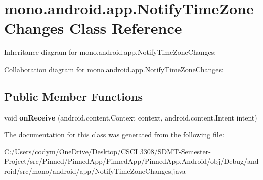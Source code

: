 \hypertarget{classmono_1_1android_1_1app_1_1_notify_time_zone_changes}{}\section{mono.\+android.\+app.\+Notify\+Time\+Zone\+Changes Class Reference}
\label{classmono_1_1android_1_1app_1_1_notify_time_zone_changes}


Inheritance diagram for mono.\+android.\+app.\+Notify\+Time\+Zone\+Changes\+:


Collaboration diagram for mono.\+android.\+app.\+Notify\+Time\+Zone\+Changes\+:
\subsection*{Public Member Functions}
\begin{DoxyCompactItemize}
\item 
\mbox{\label{classmono_1_1android_1_1app_1_1_notify_time_zone_changes_a07a0e630ae667b83ee774709cc89f20b}} 
void {\bfseries on\+Receive} (android.\+content.\+Context context, android.\+content.\+Intent intent)
\end{DoxyCompactItemize}


The documentation for this class was generated from the following file\+:\begin{DoxyCompactItemize}
\item 
C\+:/\+Users/codym/\+One\+Drive/\+Desktop/\+C\+S\+C\+I 3308/\+S\+D\+M\+T-\/\+Semester-\/\+Project/src/\+Pinned/\+Pinned\+App/\+Pinned\+App/\+Pinned\+App.\+Android/obj/\+Debug/android/src/mono/android/app/Notify\+Time\+Zone\+Changes.\+java\end{DoxyCompactItemize}
